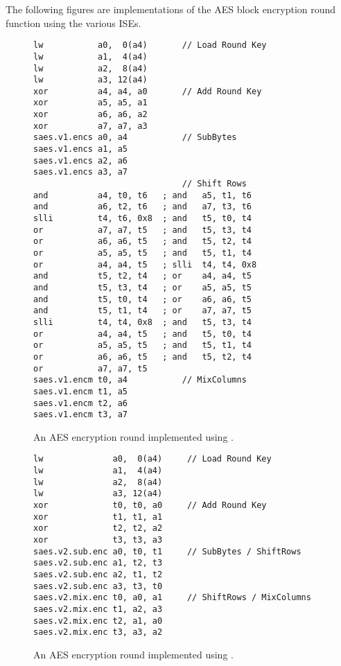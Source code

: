 
The following figures are implementations of the AES block encryption
round function using the various ISEs.

\begin{figure}[!h]
\begin{lstlisting}[language=pseudo,style=block]
lw           a0,  0(a4)       // Load Round Key
lw           a1,  4(a4)
lw           a2,  8(a4)
lw           a3, 12(a4)
xor          a4, a4, a0       // Add Round Key
xor          a5, a5, a1
xor          a6, a6, a2
xor          a7, a7, a3
saes.v1.encs a0, a4           // SubBytes
saes.v1.encs a1, a5
saes.v1.encs a2, a6
saes.v1.encs a3, a7
                              // Shift Rows
and          a4, t0, t6   ; and   a5, t1, t6
and          a6, t2, t6   ; and   a7, t3, t6
slli         t4, t6, 0x8  ; and   t5, t0, t4
or           a7, a7, t5   ; and   t5, t3, t4
or           a6, a6, t5   ; and   t5, t2, t4
or           a5, a5, t5   ; and   t5, t1, t4
or           a4, a4, t5   ; slli  t4, t4, 0x8
and          t5, t2, t4   ; or    a4, a4, t5
and          t5, t3, t4   ; or    a5, a5, t5
and          t5, t0, t4   ; or    a6, a6, t5
and          t5, t1, t4   ; or    a7, a7, t5
slli         t4, t4, 0x8  ; and   t5, t3, t4
or           a4, a4, t5   ; and   t5, t0, t4
or           a5, a5, t5   ; and   t5, t1, t4
or           a6, a6, t5   ; and   t5, t2, t4
or           a7, a7, t5
saes.v1.encm t0, a4           // MixColumns
saes.v1.encm t1, a5
saes.v1.encm t2, a6
saes.v1.encm t3, a7
\end{lstlisting}
\caption{
  An AES encryption round implemented using .
}
\label{fig:v1:round}
\end{figure}

\begin{figure}[!h]
\begin{lstlisting}[language=pseudo,style=block]
lw              a0,  0(a4)     // Load Round Key
lw              a1,  4(a4)
lw              a2,  8(a4)
lw              a3, 12(a4)
xor             t0, t0, a0     // Add Round Key
xor             t1, t1, a1
xor             t2, t2, a2
xor             t3, t3, a3
saes.v2.sub.enc a0, t0, t1     // SubBytes / ShiftRows
saes.v2.sub.enc a1, t2, t3
saes.v2.sub.enc a2, t1, t2
saes.v2.sub.enc a3, t3, t0
saes.v2.mix.enc t0, a0, a1     // ShiftRows / MixColumns
saes.v2.mix.enc t1, a2, a3
saes.v2.mix.enc t2, a1, a0
saes.v2.mix.enc t3, a3, a2
\end{lstlisting}
\caption{
  An AES encryption round implemented using .
}
\label{fig:v2:round}
\end{figure}

